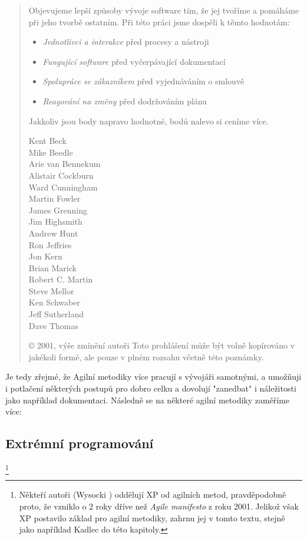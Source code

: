 \begin{quote}
Objevujeme lepší způsoby vývoje software tím,
že jej tvoříme a pomáháme při jeho tvorbě ostatním.
Při této práci jsme dospěli k těmto hodnotám:
\begin{itemize}
	\item \emph{Jednotlivci a interakce} před procesy a nástroji
	\item \emph{Fungující software} před vyčerpávající dokumentací
	\item \emph{Spolupráce se zákazníkem} před vyjednáváním o smlouvě
	\item \emph{Reagování na změny} před dodržováním plánu
\end{itemize}
Jakkoliv jsou body napravo hodnotné,
bodů nalevo si ceníme více.

\begin{multicols}{3}
Kent Beck\\
Mike Beedle\\
Arie van Bennekum\\
Alistair Cockburn\\
Ward Cunningham\\
Martin Fowler\\
James Grenning\\
Jim Highsmith\\
Andrew Hunt\\
Ron Jeffries\\
Jon Kern\\
Brian Marick\\
Robert C. Martin\\
Steve Mellor\\
Ken Schwaber\\
Jeff Sutherland\\
Dave Thomas\\
\end{multicols}

{\color{gray}
© 2001, výše zmínění autoři
Toto prohlášení může být volně kopírováno v jakékoli formě,
ale pouze v plném rozsahu včetně této poznámky.
}

\end{quote}

Je tedy zřejmé, že Agilní metodiky více pracují s vývojáři samotnými, a umožňuji i potlačení některých postupů pro dobro celku a dovolují "zanedbat" i náležitosti jako například dokumentaci. Následně se na některé agilní metodiky zaměříme více:

\subsection{Extrémní programování} \label{methods:XP} \footnote{Někteří autoři (Wysocki \cite{wysocki}) oddělují XP od agilních metod, pravděpodobně proto, že vzniklo o 2 roky dříve než \emph{Agile manifesto} \cite{manifesto} z roku 2001. Jelikož však XP postavilo základ pro agilní metodiky, zahrnu jej v tomto textu, stejně jako například Kadlec \cite{kadlec} do této kapitoly.}

